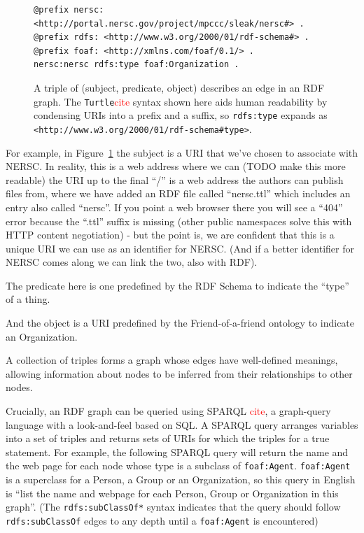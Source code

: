 \begin{figure}
\begin{verbatim}
@prefix nersc: <http://portal.nersc.gov/project/mpccc/sleak/nersc#> .
@prefix rdfs: <http://www.w3.org/2000/01/rdf-schema#> .
@prefix foaf: <http://xmlns.com/foaf/0.1/> .
nersc:nersc rdfs:type foaf:Organization .
\end{verbatim}

\caption{A triple of (subject, predicate, object) describes an edge 
in an RDF graph. The \texttt{Turtle}\textcolor{red}{cite} syntax shown
here aids human readability by condensing URIs into a prefix and a suffix,
so \texttt{rdfs:type} expands as
\texttt{<http://www.w3.org/2000/01/rdf-schema\#type>}.}
\label{f:rdftriples}
\end{figure}

For example, in Figure~\ref{f:rdftriples} the subject is a URI that 
we've chosen to associate with NERSC. In reality, this is a web address where we can 
(TODO make this more readable)
the URI up to the final ``/'' is a web address the authors
can publish files from, where we have added an RDF file called ``nersc.ttl'' 
which includes an entry also called ``nersc''. If you point a web browser 
there you will see a ``404'' error because the ``.ttl'' suffix is missing 
(other public namespaces solve this with HTTP content negotiation) - but the 
point is, we are confident that this is a unique URI we can use as an 
identifier for NERSC. (And if a better identifier for NERSC comes along 
we can link the two, also with RDF).

The predicate here is one predefined by the RDF Schema to indicate the ``type''
of a thing.

And the object is a URI predefined by the Friend-of-a-friend ontology to
indicate an Organization.

A collection of triples forms a graph whose edges have well-defined meanings, 
allowing information about nodes to be inferred from their relationships to 
other nodes.

Crucially, an RDF graph can be queried using SPARQL \textcolor{red}{cite}, a
graph-query language with a look-and-feel based on SQL. A SPARQL query 
arranges variables into a set of triples and returns sets of URIs for which
the triples for a true statement. For example, the following SPARQL query
will return the name and the web page for each node whose type is 
a subclass of \texttt{foaf:Agent}. \texttt{foaf:Agent} is a superclass for a Person, a 
Group or an Organization, so this query in English is ``list the name and 
webpage for each Person, Group or Organization in this graph''. (The 
\texttt{rdfs:subClassOf*} syntax indicates that the query should follow 
\texttt{rdfs:subClassOf} edges to any depth until a \texttt{foaf:Agent} is encountered)

